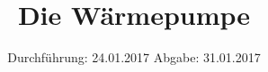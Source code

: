 


\subject{V206}
\title{Die Wärmepumpe}
\date{
	Durchführung: 24.01.2017
	\hspace{4em}
	Abgabe: 31.01.2017
}


	\maketitle
	\newpage
	\tableofcontents
	\newpage
	
	
	
	
	
	
	\newpage
	
	\printbibliography

